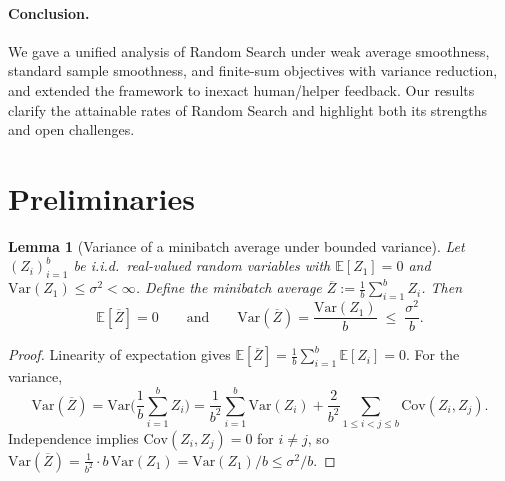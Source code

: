 \documentclass[twoside]{article}
\theoremstyle{plain}
\newtheorem{lemma}{Lemma}[section]
\theoremstyle{definition}
\theoremstyle{remark}
\newcommand{\E}{\mathbb{E}}
\newcommand{\Var}{\mathrm{Var}}
\newcommand{\Cov}{\mathrm{Cov}}
\begin{document}
\paragraph{Conclusion.}
We gave a unified analysis of Random Search under weak average smoothness,
standard sample smoothness, and finite-sum objectives with variance reduction,
and extended the framework to inexact human/helper feedback. Our results clarify
the attainable rates of Random Search and highlight both its strengths and open
challenges.





\newpage







\clearpage
\appendix



\onecolumn
\setlength{\footskip}{24pt} %
\raggedbottom 




\section{Preliminaries}\begin{propbox}
\begin{lemma}[Variance of a minibatch average under bounded variance]
\label{lem:var-average}
Let $(Z_i)_{i=1}^b$ be i.i.d.\ real-valued random variables with
$\E[Z_1]=0$ and $\Var(Z_1)\le \sigma^2<\infty$. Define the minibatch
average $\overline{Z} := \tfrac{1}{b}\sum_{i=1}^b Z_i$. Then
\[
    \E[\overline{Z}] = 0
    \qquad\text{and}\qquad
    \Var(\overline{Z}) = \frac{\Var(Z_1)}{b} \;\le\; \frac{\sigma^2}{b}.
\]
\end{lemma}
\end{propbox}
\begin{proof}
Linearity of expectation gives $\E[\overline{Z}]=\tfrac{1}{b}\sum_{i=1}^b \E[Z_i]=0$.
For the variance,
\[
    \Var(\overline{Z})
    = \Var\!\Big(\frac{1}{b}\sum_{i=1}^b Z_i\Big)
    = \frac{1}{b^2}\sum_{i=1}^b \Var(Z_i)
      + \frac{2}{b^2}\sum_{1\le i<j\le b}\Cov(Z_i,Z_j).
\]
Independence implies $\Cov(Z_i,Z_j)=0$ for $i\neq j$, so
$\Var(\overline{Z})=\tfrac{1}{b^2}\cdot b\,\Var(Z_1)=\Var(Z_1)/b \le \sigma^2/b$.
\end{proof}
\end{document}
